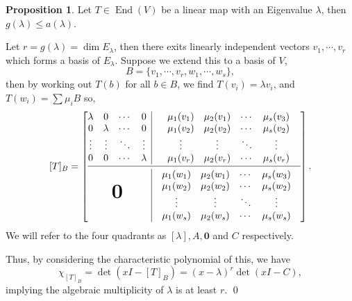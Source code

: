 \documentclass[
]{article}
\theoremstyle{definition}
\newtheorem{prop}{Proposition}[section]
\theoremstyle{definition}
\begin{document}
\begin{prop}
  Let \(T \in \mathop{\mathrm{End}}(V)\) be a linear map with an Eigenvalue \(\lambda\), then 
  \(g(\lambda) \le a(\lambda)\).
\end{prop}
\proof

Let \(r = g(\lambda) = \dim E_{\lambda}\), then there exits linearly
independent vectors \(v_1, \cdots, v_r\) which forms a basis of
\(E_{\lambda}\). Suppose we extend this to a basis of \(V\),
\[B = \{v_1, \cdots, v_r, w_1, \cdots, w_s\},\] then by working out
\(T(b)\) for all \(b \in B\), we find \(T(v_i) = \lambda v_i\), and
\(T(w_i) = \sum \mu_i B\) so, \[ [T]_B =
  \left[
    \begin{array}{@{}c|c@{}}
      \begin{matrix}
        \lambda & 0 & \cdots & 0 \\
        0 & \lambda & \cdots & 0 \\
        \vdots & \vdots & \ddots & \vdots \\
        0 & 0 & \cdots & \lambda \\
      \end{matrix}
          & 
      \begin{matrix}
        \mu_1(v_1) & \mu_2(v_1) & \cdots & \mu_s(v_3) \\
        \mu_1(v_2) & \mu_2(v_2) & \cdots & \mu_s(v_2) \\
        \vdots & \vdots & \ddots & \vdots\\
        \mu_1(v_r) & \mu_2(v_r) & \cdots & \mu_s(v_r)\\
      \end{matrix} \\
      \cmidrule[0.4pt]{1-2}
      \textbf{\text{\huge0}} & \hspace{2mm}
      \begin{matrix}
        \mu_1(w_1) & \mu_2(w_1) & \cdots & \mu_s(w_3)\\
        \mu_1(w_2) & \mu_2(w_2) & \cdots & \mu_s(w_2)\\
        \vdots & \vdots & \ddots & \vdots &\\
        \mu_1(w_s) & \mu_2(w_s) & \cdots & \mu_s(w_s)\\
      \end{matrix} \\
    \end{array} 
  \right]. \] We will refer to the four quadrants as
\([\lambda], A, \mathbf{0}\) and \(C\) respectively.

Thus, by considering the characteristic polynomial of this, we have
\[\chi_{[T]_B} = \det(xI - [T]_B) =  (x - \lambda)^r \det(xI - C),\]
implying the algebraic multiplicity of \(\lambda\) is at least \(r\).
\qed
\end{document}
